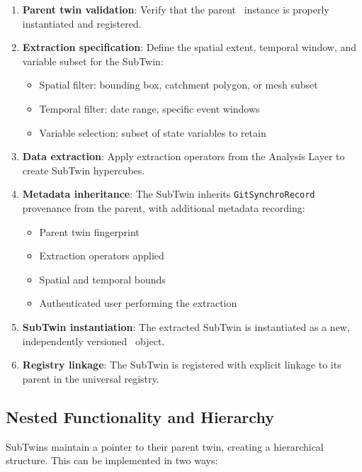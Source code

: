 \begin{enumerate}
\item \textbf{Parent twin validation}: Verify that the parent \hydrot\ instance is properly instantiated and registered.

\item \textbf{Extraction specification}: Define the spatial extent, temporal window, and variable subset for the SubTwin:
\begin{itemize}
    \item Spatial filter: bounding box, catchment polygon, or mesh subset
    \item Temporal filter: date range, specific event windows
    \item Variable selection: subset of state variables to retain
\end{itemize}

\item \textbf{Data extraction}: Apply extraction operators from the Analysis Layer to create SubTwin hypercubes.

\item \textbf{Metadata inheritance}: The SubTwin inherits \texttt{GitSynchroRecord} provenance from the parent, with additional metadata recording:
\begin{itemize}
    \item Parent twin fingerprint
    \item Extraction operators applied
    \item Spatial and temporal bounds
    \item Authenticated user performing the extraction
\end{itemize}

\item \textbf{SubTwin instantiation}: The extracted SubTwin is instantiated as a new, independently versioned \hydrot\ object.

\item \textbf{Registry linkage}: The SubTwin is registered with explicit linkage to its parent in the universal registry.
\end{enumerate}

\subsection{Nested Functionality and Hierarchy}

SubTwins maintain a pointer to their parent twin, creating a hierarchical structure. This can be implemented in two ways:

